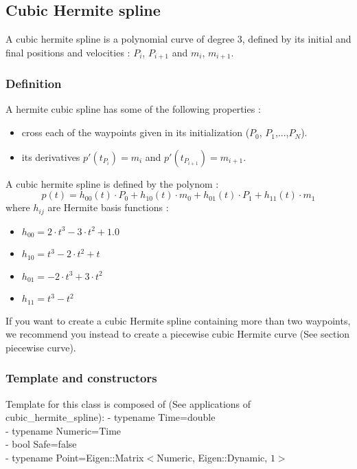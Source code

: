 \documentclass{article}
\begin{document}
\subsection{Cubic Hermite spline}
    A cubic hermite spline is a polynomial curve of degree 3, defined by its initial and final positions and velocities : $P_i$, $P_{i+1}$ and $m_i$, $m_{i+1}$.\\

    \subsubsection{Definition}

    A hermite cubic spline has some of the following properties :
    \begin{itemize}
        \item cross each of the waypoints given in its initialization ($P_0$, $P_1$,...,$P_N$).
        \item its derivatives $p'(t_{P_i}) = m_i$ and $p'(t_{P_{i+1}}) = m_{i+1}$.
    \end{itemize}
    A cubic hermite spline is defined by the polynom :
    \begin{equation}\label{eq:hermiteSpline}
    p(t)=h_{00}(t)\cdot P_0 + h_{10}(t) \cdot m_0 + h_{01}(t) \cdot P_1 + h_{11}(t) \cdot m_1
    \end{equation}
    where $h_{ij}$ are Hermite basis functions :
    \begin{itemize}
        \item $h_{00} = 2 \cdot t^3 - 3 \cdot t^2 + 1.0$
        \item $h_{10} = t^3 - 2 \cdot t^2 + t$
        \item $h_{01} = -2 \cdot t^3 + 3 \cdot t^2$
        \item $h_{11} = t^3 - t^2$
    \end{itemize}

    If you want to create a cubic Hermite spline containing more than two waypoints,
    we recommend you instead to create a piecewise cubic Hermite curve (See section piecewise curve).

    \subsubsection{Template and constructors}

    Template for this class is composed of (See applications of cubic\_hermite\_spline):
    - typename Time=double\\
    - typename Numeric=Time\\
    - bool Safe=false\\
    - typename Point=Eigen::Matrix$<$Numeric, Eigen::Dynamic, $1>$\\
\end{document}
